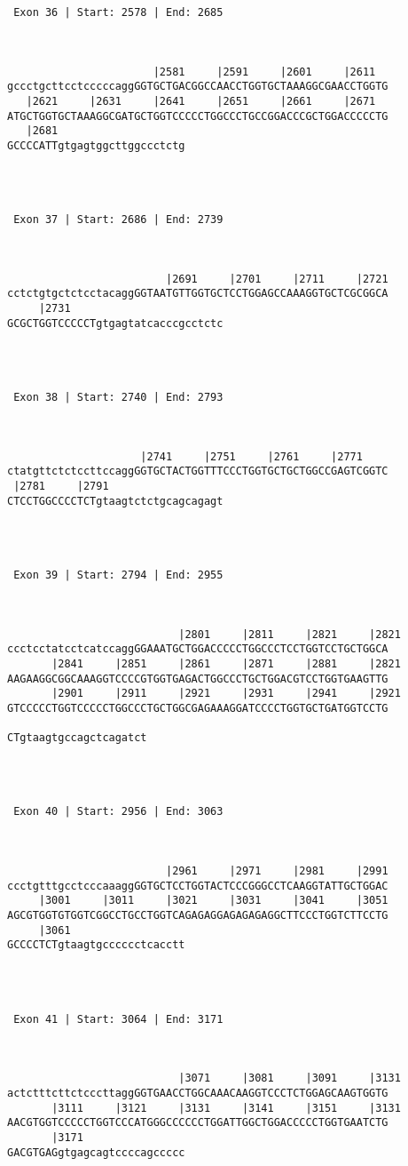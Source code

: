 \documentclass{article}
\begin{document}
\begin{Verbatim}
 Exon 36 | Start: 2578 | End: 2685 



                       |2581     |2591     |2601     |2611  
gccctgcttcctcccccaggGGTGCTGACGGCCAACCTGGTGCTAAAGGCGAACCTGGTG
   |2621     |2631     |2641     |2651     |2661     |2671  
ATGCTGGTGCTAAAGGCGATGCTGGTCCCCCTGGCCCTGCCGGACCCGCTGGACCCCCTG
   |2681                    
GCCCCATTgtgagtggcttggccctctg




 Exon 37 | Start: 2686 | End: 2739 



                         |2691     |2701     |2711     |2721
cctctgtgctctcctacaggGGTAATGTTGGTGCTCCTGGAGCCAAAGGTGCTCGCGGCA
     |2731                        
GCGCTGGTCCCCCTgtgagtatcacccgcctctc




 Exon 38 | Start: 2740 | End: 2793 



                     |2741     |2751     |2761     |2771    
ctatgttctctccttccaggGGTGCTACTGGTTTCCCTGGTGCTGCTGGCCGAGTCGGTC
 |2781     |2791                  
CTCCTGGCCCCTCTgtaagtctctgcagcagagt




 Exon 39 | Start: 2794 | End: 2955 



                           |2801     |2811     |2821     |2821
ccctcctatcctcatccaggGGAAATGCTGGACCCCCTGGCCCTCCTGGTCCTGCTGGCA
       |2841     |2851     |2861     |2871     |2881     |2821
AAGAAGGCGGCAAAGGTCCCCGTGGTGAGACTGGCCCTGCTGGACGTCCTGGTGAAGTTG
       |2901     |2911     |2921     |2931     |2941     |2921
GTCCCCCTGGTCCCCCTGGCCCTGCTGGCGAGAAAGGATCCCCTGGTGCTGATGGTCCTG
                      
CTgtaagtgccagctcagatct




 Exon 40 | Start: 2956 | End: 3063 



                         |2961     |2971     |2981     |2991
ccctgtttgcctcccaaaggGGTGCTCCTGGTACTCCCGGGCCTCAAGGTATTGCTGGAC
     |3001     |3011     |3021     |3031     |3041     |3051
AGCGTGGTGTGGTCGGCCTGCCTGGTCAGAGAGGAGAGAGAGGCTTCCCTGGTCTTCCTG
     |3061                  
GCCCCTCTgtaagtgcccccctcacctt




 Exon 41 | Start: 3064 | End: 3171 



                           |3071     |3081     |3091     |3131
actctttcttctcccttaggGGTGAACCTGGCAAACAAGGTCCCTCTGGAGCAAGTGGTG
       |3111     |3121     |3131     |3141     |3151     |3131
AACGTGGTCCCCCTGGTCCCATGGGCCCCCCTGGATTGGCTGGACCCCCTGGTGAATCTG
       |3171                
GACGTGAGgtgagcagtccccagccccc





\end{Verbatim}
\end{document}
